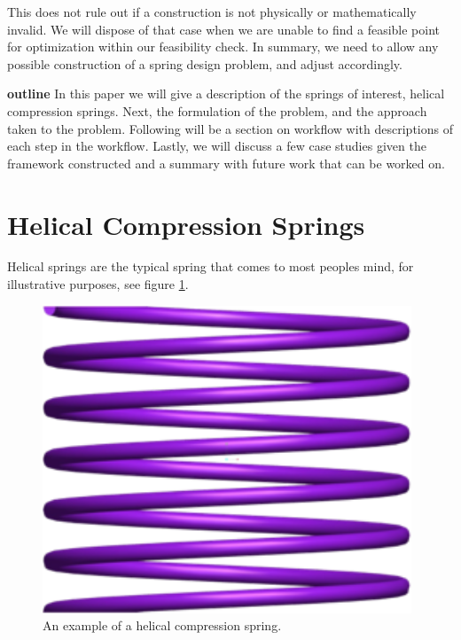 \documentclass[10pt]{article}
\begin{document}
This does not rule out if a construction is not physically or mathematically invalid. We will dispose of that case when we are unable to find a feasible point for optimization within our feasibility check. In summary, we need to allow any possible construction of a spring design problem, and adjust accordingly. 


\textbf{outline}
In this paper we will give a description of the springs of interest, helical compression springs. Next, the formulation of the problem, and the approach taken to the problem. Following will be a section on workflow with descriptions of each step in the workflow. Lastly, we will discuss a few case studies given the framework constructed and a summary with future work that can be worked on.





\section{Helical Compression Springs}

Helical springs are the typical spring that comes to most peoples mind, for illustrative purposes, see figure \ref{Spring}. 

		\begin{figure}[h]
		 \begin{center}\includegraphics[scale=.2]{Spring.png}\end{center}
		 \caption{An example of a helical compression spring.}
		 \label{Spring}
		 
		 \end{figure}
\end{document}
